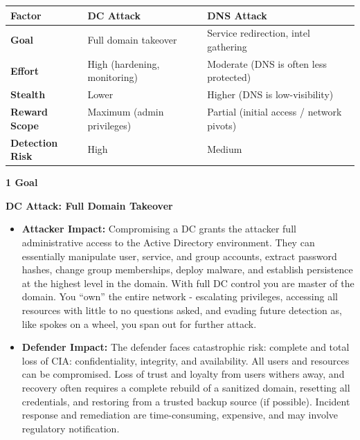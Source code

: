 \begin{table}
\centering

\begin{tabular}{| l | l | l |}
\hline
\textbf{Factor} & \textbf{DC Attack} & \textbf{DNS Attack} \\
\hline
\textbf{Goal} & Full domain takeover & Service redirection, intel gathering \\
\hline
\textbf{Effort} & High (hardening, monitoring) & Moderate (DNS is often less protected) \\
\hline
\textbf{Stealth} & Lower & Higher (DNS is low-visibility) \\
\hline
\textbf{Reward Scope} & Maximum (admin privileges) & Partial (initial access / network pivots) \\
\hline
\textbf{Detection Risk} & High & Medium \\
\hline

\end{tabular}

\end{table}

\textbf{1 Goal}

\textbf{DC Attack: Full Domain Takeover}

\begin{itemize}
    \item \textbf{\textbf{Attacker Impact:}}
Compromising a DC grants the attacker full administrative access to the Active Directory environment. They can essentially manipulate user, service, and group accounts, extract password hashes, change group memberships, deploy malware, and establish persistence at the highest level in the domain. With full DC control you are master of the domain. You “own” the entire network - escalating privileges, accessing all resources with little to no questions asked, and evading future detection as, like spokes on a wheel, you span out for further attack.

    \item \textbf{\textbf{Defender Impact:}}
The defender faces catastrophic risk: complete and total loss of CIA: confidentiality, integrity, and availability. All users and resources can be compromised. Loss of trust and loyalty from users withers away, and recovery often requires a complete rebuild of a sanitized domain, resetting all credentials, and restoring from a trusted backup source (if possible). Incident response and remediation are time-consuming, expensive, and may involve regulatory notification.

\end{itemize}

